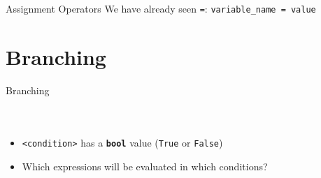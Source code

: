         \begin{frame}{Assignment Operators}
            \LARGE
            We have already seen \texttt{\textquotesingle=\textquotesingle}: 
            \pause
            \texttt{variable\_name = value}


        \end{frame}

    \section{Branching}
        \begin{frame}{Branching}
            \vspace{-3mm}
            \begin{columns}
                \inputminted[firstline=1, lastline=4, frame=single,framesep=2pt]{python3}{code-examples/branching.py}
                \inputminted[firstline=6, lastline=13, frame=single,framesep=2pt]{python3}{code-examples/branching.py}
                \inputminted[firstline=15, lastline=27, frame=single,framesep=2pt]{python3}{code-examples/branching.py}
            \end{columns}
            \begin{itemize}
                \item \texttt{<condition>} has a \textbf{\texttt{bool}} value (\texttt{True} or \texttt{False})
                \item Which expressions will be evaluated in which conditions?
            \end{itemize}
        \end{frame}

